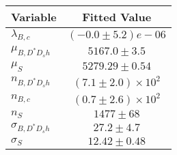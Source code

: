\begin{tabular}[t]{lc}
\hline
Variable &Fitted Value\\
\hline\hline
$\lambda_{B,c}$&$(-0.0\pm5.2)e-06$\\
\hline
$\mu_{B, D^* D_s h}$&$5167.0\pm3.5$\\
\hline
$\mu_S$&$5279.29\pm0.54$\\
\hline
$n_{B, D^* D_s h}$&$(7.1\pm2.0)\times 10^2$\\
\hline
$n_{B,c}$&$(0.7\pm2.6)\times 10^2$\\
\hline
$n_S$&$1477\pm68$\\
\hline
$\sigma_{B, D^* D_s h}$&$27.2\pm4.7$\\
\hline
$\sigma_S$&$12.42\pm0.48$\\
\hline
\end{tabular}